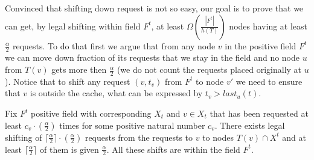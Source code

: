 Convinced that shifting down request is not so easy, our goal is to prove that 
we can get, by legal shifting within field $F^t$, 
at least $\Omega(\frac{|F^t|}{h(T)})$ nodes having at least $\frac{\alpha}{2}$ 
requests. To do that first we argue that from any node $v$ in the positive 
field $F^t$ we can move down fraction of its requests that we stay in the field 
and no node $u$ from $T(v)$ gets more then $\frac{\alpha}{2}$ (we do not count 
the requests placed originally at $u$). Notice that to shift any request $(v, 
t_v)$ from $F^t$ to node $v'$ we need to ensure that $v$ is outside the cache, 
what can be expressed by $t_v > last_u(t)$.

\begin{lemma}
Fix $F^t$ positive field with corresponding $X_t$ and $v \in X_t$ that has 
been requested at least $c_v \cdot (\frac{\alpha}{2})$ times for some positive 
natural number $c_v$. There exists legal shifting of $\lceil \frac{\alpha}{2} 
\rceil \cdot (\frac{\alpha}{2})$ requests from the requests to $v$ to nodes 
$T(v) \cap X^t$ and at least $\lceil \frac{\alpha}{2} \rceil$ of them is given 
$\frac{\alpha}{2}$. All these shifts are within the field $F^t$.
\label{thm:request_mapping}
\end{lemma}
